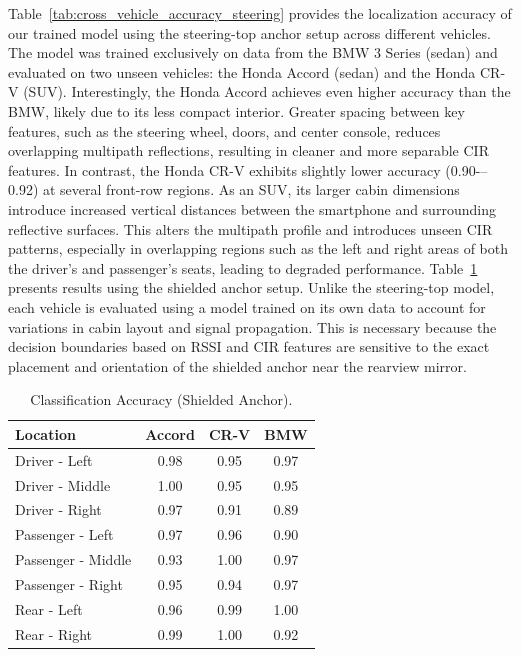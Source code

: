 \documentclass[sigconf]{acmart}
\newcommand{\vp}{\vspace{-1.5em}}
\begin{document}



Table~\ref{tab:cross_vehicle_accuracy_steering} provides the localization 
accuracy of our trained model using the steering-top anchor setup across different vehicles. 
The model was trained exclusively on data from the BMW 3 Series (sedan) and 
evaluated on two unseen vehicles: the Honda Accord (sedan) and the Honda CR-V (SUV).
%
Interestingly, the Honda Accord achieves even higher accuracy than the BMW, likely due to its less compact interior. 
%
Greater spacing between key features, such as the steering wheel, doors, and center console, reduces overlapping multipath reflections, resulting in cleaner and more separable CIR features.
%
In contrast, the Honda CR-V exhibits slightly lower accuracy (0.90-–0.92) 
at several front-row regions. As an SUV, its larger cabin dimensions 
introduce increased vertical distances between the smartphone and surrounding reflective surfaces. This alters the multipath profile and introduces unseen CIR patterns, especially in overlapping regions such as the left and right areas of both the driver’s and passenger’s seats, leading to degraded performance. Table~\ref{tab:cross_vehicle_accuracy_shielded} presents results using the 
shielded anchor setup. Unlike the steering-top model, each vehicle is evaluated using a model trained on its own data to account for variations in cabin layout and signal propagation. This is necessary because the decision boundaries based on RSSI and CIR features are sensitive to the exact placement and orientation of the shielded anchor near the rearview mirror.

%
\begin{table}[t]
\centering
\small
\caption{Classification Accuracy (Shielded Anchor).}
\label{tab:cross_vehicle_accuracy_shielded}
\vp
\begin{tabular}{|l|c|c|c|}
\hline
\textbf{Location} & \textbf{Accord} & \textbf{CR-V} & \textbf{BMW} \\ \hline
Driver - Left & 0.98 & 0.95 & 0.97 \\
Driver - Middle & 1.00 & 0.95 & 0.95 \\
Driver - Right & 0.97 & 0.91 & 0.89 \\ \hline
Passenger - Left & 0.97 & 0.96 & 0.90 \\
Passenger - Middle & 0.93 & 1.00 & 0.97 \\
Passenger - Right & 0.95 & 0.94 & 0.97 \\ \hline
Rear - Left & 0.96 & 0.99 & 1.00 \\
Rear - Right & 0.99 & 1.00 & 0.92 \\ \hline
\end{tabular}
\vp
\end{table}
\end{document}
